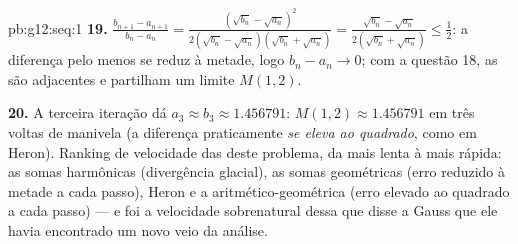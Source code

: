 \begin{solution}{pb:g12:seq:1}
\textbf{19.} $\frac{b_{n+1} - a_{n+1}}{b_n - a_n} =
\frac{(\sqrt{b_n} - \sqrt{a_n})^2}
{2(\sqrt{b_n} - \sqrt{a_n})(\sqrt{b_n} + \sqrt{a_n})}
= \frac{\sqrt{b_n} - \sqrt{a_n}}{2(\sqrt{b_n} + \sqrt{a_n})}
\leq \frac12$: a diferença pelo menos se reduz à metade, logo
$b_n - a_n \to 0$; com a questão 18, as  são
adjacentes e partilham um limite $M(1, 2)$.

\textbf{20.} A terceira iteração dá
$a_3 \approx b_3 \approx 1.456791$: $M(1, 2) \approx
1.456791$ em três voltas de manivela (a diferença praticamente
\emph{se eleva ao quadrado}, como em Heron). Ranking de
velocidade das  deste problema, da mais lenta à mais
rápida: as somas harmônicas (divergência glacial), as somas
geométricas (erro reduzido à metade a cada passo), Heron e a
 aritmético-geométrica (erro elevado ao quadrado a cada
passo) --- e foi a velocidade sobrenatural dessa  que disse
a Gauss que ele havia encontrado um novo veio da análise.
\end{solution}
